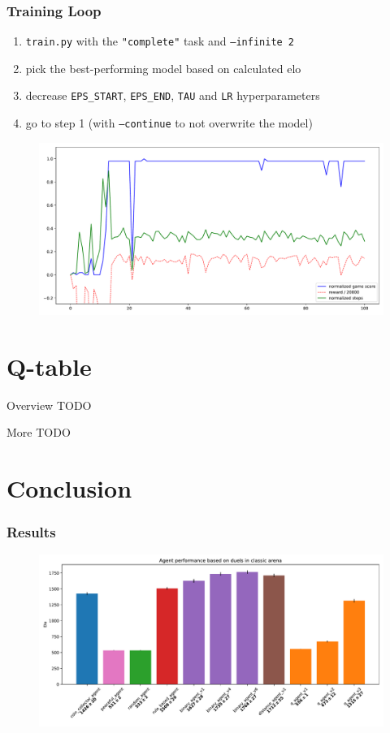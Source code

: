 \documentclass{beamer}
\begin{document}
\begin{frame}[fragile]
	\frametitle{Training Loop}
	\pause

	\begin{enumerate}
			\item \texttt{train.py} with the \texttt{"complete"} task and \texttt{--infinite 2}
			\item pick the best-performing model based on calculated elo
			\item decrease \texttt{EPS\_START}, \texttt{EPS\_END}, \texttt{TAU} and \texttt{LR} hyperparameters
			\item go to step 1 (with \texttt{--continue} to not overwrite the model)
	\end{enumerate}

	\pause
	\begin{figure}[t]
			\centering
			\includegraphics[width=.8\linewidth]{coins.pdf}
	\end{figure}
\end{frame}

\section{Q-table}

\begin{frame}{Overview}
	TODO

	\pause

	More TODO
\end{frame}

\section{Conclusion}

\begin{frame}[fragile]
	\frametitle{Results}
	\pause

	\begin{figure}[t]
			\centering
			\includegraphics[width=1\linewidth]{elo.pdf}
	\end{figure}
\end{frame}
\end{document}
